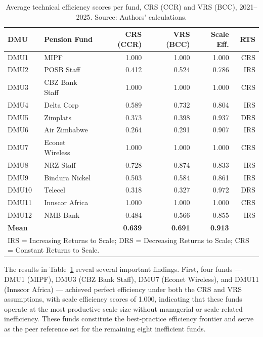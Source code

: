 \documentclass[12pt,a4paper]{article}
\begin{document}
\begin{table}[H]
\centering
\caption{Average technical efficiency scores per fund, CRS (CCR) and VRS (BCC), 2021--2025. Source: Authors' calculations.}
\label{tab:vrs_scores}
\begin{tabular}{llrrrr}
\toprule
\textbf{DMU} & \textbf{Pension Fund} & \textbf{CRS (CCR)} & \textbf{VRS (BCC)} & \textbf{Scale Eff.} & \textbf{RTS} \\
\midrule
DMU1  & MIPF              & 1.000 & 1.000 & 1.000 & CRS \\
DMU2  & POSB Staff        & 0.412 & 0.524 & 0.786 & IRS \\
DMU3  & CBZ Bank Staff    & 1.000 & 1.000 & 1.000 & CRS \\
DMU4  & Delta Corp        & 0.589 & 0.732 & 0.804 & IRS \\
DMU5  & Zimplats          & 0.373 & 0.398 & 0.937 & DRS \\
DMU6  & Air Zimbabwe      & 0.264 & 0.291 & 0.907 & IRS \\
DMU7  & Econet Wireless   & 1.000 & 1.000 & 1.000 & CRS \\
DMU8  & NRZ Staff         & 0.728 & 0.874 & 0.833 & IRS \\
DMU9  & Bindura Nickel    & 0.503 & 0.584 & 0.861 & IRS \\
DMU10 & Telecel           & 0.318 & 0.327 & 0.972 & DRS \\
DMU11 & Innscor Africa    & 1.000 & 1.000 & 1.000 & CRS \\
DMU12 & NMB Bank          & 0.484 & 0.566 & 0.855 & IRS \\
\midrule
\textbf{Mean} & & \textbf{0.639} & \textbf{0.691} & \textbf{0.913} & \\
\bottomrule
\multicolumn{6}{l}{\footnotesize IRS = Increasing Returns to Scale; DRS = Decreasing Returns to Scale; CRS = Constant Returns to Scale.}
\end{tabular}
\end{table}

The results in Table~\ref{tab:vrs_scores} reveal several important findings. First, four funds --- DMU1 (MIPF), DMU3 (CBZ Bank Staff), DMU7 (Econet Wireless), and DMU11 (Innscor Africa) --- achieved perfect efficiency under both the CRS and VRS assumptions, with scale efficiency scores of 1.000, indicating that these funds operate at the most productive scale size without managerial or scale-related inefficiency. These funds constitute the best-practice efficiency frontier and serve as the peer reference set for the remaining eight inefficient funds.
\end{document}
